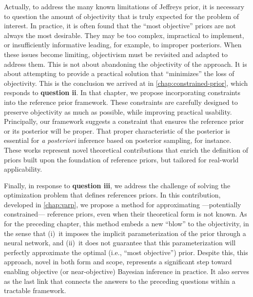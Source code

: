 Actually, to address the many known limitations of Jeffreys prior, it is necessary to question the amount of objectivity that is truly expected for the problem of interest. %
In practice, it is often found that the ``most objective'' priors are not always the most desirable. They may be too complex, impractical to implement, or insufficiently informative leading, for example, to improper posteriors. 
When these issues become limiting, objectivism must be revisited and adapted to address them. This is not about abandoning the objectivity of the approach. It is about attempting to provide a practical solution that ``minimizes'' the loss of objectivity.
%
%
This is the conclusion we arrived at in \cref{chap:constrained-prior}, which responds to \textbf{question ii}.
In that chapter, we propose incorporating constraints into the reference prior framework. These constraints are carefully designed to preserve objectivity as much as possible, while improving practical usability. 
Principally, our framework suggests a constraint that ensures the reference prior or its posterior will be proper. That proper characteristic of the posterior is essential for \emph{a posteriori} inference based on posterior sampling, for instance.
These works represent novel theoretical contributions that enrich the definition of priors built upon the foundation of reference priors, but tailored for real-world applicability.

Finally, in response to \textbf{question iii}, we address the challenge of solving the optimization problem that defines references priors. %
In this contribution, developed in \cref{chap:varp}, we propose a method for approximating ---potentially constrained--- reference priors, even when their theoretical form is not known. As for the preceding chapter, this method embeds a new ``blow'' to the objectivity, in the sense that (i)~it imposes the implicit parameterization of the prior through a neural network, and (ii)~it does not guarantee that this parameterization will perfectly approximate the optimal (i.e., ``most objective'') prior. %
Despite this, this approach, novel in both form and scope, represents a significant step toward enabling objective (or near-objective) Bayesian inference in practice. It also serves as the last link that connects the answers to the preceding questions within a tractable framework.

